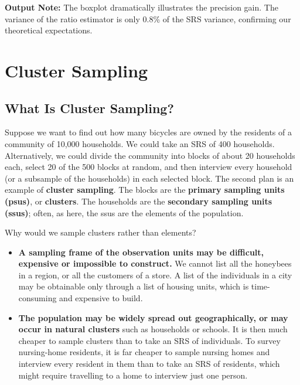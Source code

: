 \documentclass[
  letterpaper,
  DIV=11,
  numbers=noendperiod]{scrreprt}
\providecommand{\tightlist}{%
  \setlength{\itemsep}{0pt}\setlength{\parskip}{0pt}}
\renewcommand{\[}{\begin{equation}}
\renewcommand{\]}{\end{equation}}
\begin{document}
\textbf{Output Note:} The boxplot dramatically illustrates the precision
gain. The variance of the ratio estimator is only 0.8\% of the SRS
variance, confirming our theoretical expectations.


\chapter{Cluster Sampling}\label{cluster-sampling}

\section{What Is Cluster Sampling?}\label{sec-cluster-intro}

Suppose we want to find out how many bicycles are owned by the residents
of a community of 10,000 households. We could take an SRS of 400
households. Alternatively, we could divide the community into blocks of
about 20 households each, select 20 of the 500 blocks at random, and
then interview every household (or a subsample of the households) in
each selected block. The second plan is an example of \textbf{cluster
sampling}. The blocks are the \textbf{primary sampling units (psus)}, or
\textbf{clusters}. The households are the \textbf{secondary sampling
units (ssus)}; often, as here, the ssus are the elements of the
population.

Why would we sample clusters rather than elements?

\begin{itemize}
\tightlist
\item
  \textbf{A sampling frame of the observation units may be difficult,
  expensive or impossible to construct.} We cannot list all the
  honeybees in a region, or all the customers of a store. A list of the
  individuals in a city may be obtainable only through a list of housing
  units, which is time-consuming and expensive to build.
\item
  \textbf{The population may be widely spread out geographically, or may
  occur in natural clusters} such as households or schools. It is then
  much cheaper to sample clusters than to take an SRS of individuals. To
  survey nursing-home residents, it is far cheaper to sample nursing
  homes and interview every resident in them than to take an SRS of
  residents, which might require travelling to a home to interview just
  one person.
\end{itemize}
\end{document}
